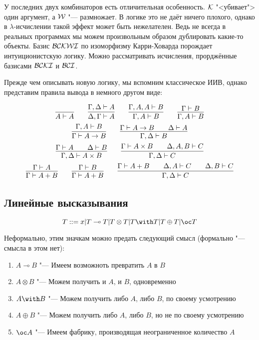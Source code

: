 У последних двух комбинаторов есть отличительная особенность. $\operatorname{\mathcal{K}}$ "<убивает"> один аргумент, а $\operatorname{\mathcal{W}}$ "--- размножает.
В логике это не даёт ничего плохого, однако в $\lambda$-исчислении такой эффект может быть нежелателен.
Ведь не всегда в реальных программах мы можем произвольным образом дублировать какие-то объекты.
Базис $\operatorname{\mathcal{BCKWI}}$ по изоморфизму Карри-Ховарда порождает интуиционистскую логику.
Можно рассматривать исчисления, прорджённые базисами $\operatorname{\mathcal{BCKI}}$ и $\operatorname{\mathcal{BCI}}$.

Прежде чем описывать новую логику, мы вспомним классическое ИИВ, однако представим правила вывода в немного другом виде:
\begin{@empty} \inferspacing
\begin{gather*}
    \infer{A \vdash A}{} \qquad
    \infer{\Delta, \Gamma \vdash A}{\Gamma, \Delta \vdash A} \qquad
    \infer{\Gamma, A \vdash B}{\Gamma, A, A \vdash B} \qquad
    \infer{\Gamma, A \vdash B}{\Gamma \vdash B} \\
    \infer{\Gamma \vdash A \to B}{\Gamma, A \vdash B} \qquad
    \infer{\Gamma, \Delta \vdash B}{\Gamma \vdash A \to B && \Delta \vdash A} \\
    \infer{\Gamma, \Delta \vdash A \times B}{\Gamma \vdash A && \Delta \vdash B} \qquad
    \infer{\Gamma, \Delta \vdash C}{\Gamma \vdash A \times B && \Delta, A, B \vdash C}\\
    \infer{\Gamma \vdash A + B}{\Gamma \vdash A} \qquad
    \infer{\Gamma \vdash A + B}{\Gamma \vdash B} \qquad
    \infer{\Gamma, \Delta \vdash C}{\Gamma \vdash A + B && \Delta, A \vdash C && \Delta, B \vdash C}
\end{gather*}
\end{@empty}%

\subsection{\texorpdfstring{Линейные высказывания}{Linear statements}}
\begin{definition}
    \begin{bnf}
    \[
        T ::= x | T \multimap T | T \otimes T | T \with T | T \oplus T | \oc T
    \]
    \end{bnf}
\end{definition}
Неформально, этим значкам можно предать следующий смысл (формально "--- смысла в этом нет):
\begin{enumerate}
	\item $A \multimap B$  "--- Имеем возможноть превратить $A$ в $B$
	\item $A \otimes B$ "--- Можем получить и $A$, и $B$, одновременно
	\item $A \with B$ "--- Можем получить либо $A$, либо $B$, по своему усмотрению
	\item $A \oplus B$ "--- Можем получить либо $A$, либо $B$, но не по своему усмотрению
	\item $\oc A$ "--- Имеем фабрику, производящая  неограниченное количество $A$
\end{enumerate}

